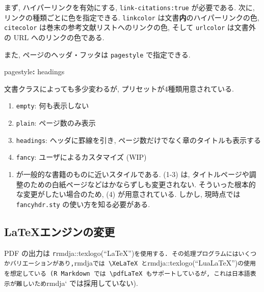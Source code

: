 \documentclass[
]{bxjsbook}
\newenvironment{Shaded}{\begin{snugshade}}{\end{snugshade}}
\newcommand{\AttributeTok}[1]{\textcolor[rgb]{0.77,0.63,0.00}{#1}}
\newcommand{\FunctionTok}[1]{\textcolor[rgb]{0.00,0.00,0.00}{#1}}
\newcommand{\KeywordTok}[1]{\textcolor[rgb]{0.13,0.29,0.53}{\textbf{#1}}}
\providecommand{\tightlist}{%
  \setlength{\itemsep}{0pt}\setlength{\parskip}{0pt}}
\theoremstyle{definition}
\theoremstyle{definition}
\theoremstyle{definition}
\theoremstyle{remark}
\begin{document}
まず, ハイパーリンクを有効にする, \texttt{link-citations:true}
が必要である. 次に, リンクの種類ごとに色を指定できる. \texttt{linkcolor}
は文書\textbf{内}のハイパーリンクの色, \texttt{citecolor}
は巻末の参考文献リストへのリンクの色, そして \texttt{urlcolor}
は文書外の URL へのリンクの色である.

また, ページのヘッダ・フッタは \texttt{pagestyle} で指定できる.

\begin{Shaded}
\begin{Highlighting}[]
\FunctionTok{pagestyle}\KeywordTok{:}\AttributeTok{ headings}
\end{Highlighting}
\end{Shaded}

文書クラスによっても多少変わるが, プリセットが4種類用意されている.

\begin{enumerate}
\def\labelenumi{\arabic{enumi}.}
\tightlist
\item
  \texttt{empty}: 何も表示しない
\item
  \texttt{plain}: ページ数のみ表示
\item
  \texttt{headings}: ヘッダに罫線を引き,
  ページ数だけでなく章のタイトルも表示する
\item
  \texttt{fancy}: ユーザによるカスタマイズ (WIP)
\end{enumerate}

\begin{enumerate}
\def\labelenumi{(\arabic{enumi})}
\setcounter{enumi}{2}
\tightlist
\item
  が一般的な書籍のものに近いスタイルである. (1-3) は,
  タイトルページや調整のための白紙ページなどはかならずしも変更されない.
  そういった根本的な変更がしたい場合のため, (4) が用意されている.
  しかし, 現時点では \texttt{fancyhdr.sty} の使い方を知る必要がある.
\end{enumerate}

\hypertarget{ux30a8ux30f3ux30b8ux30f3ux306eux5909ux66f4}{%
\subsection{\texorpdfstring{\LaTeX エンジンの変更}{エンジンの変更}}\label{ux30a8ux30f3ux30b8ux30f3ux306eux5909ux66f4}}

PDF の出力は
\texttt{r}rmdja::texlogo(``LaTeX'')\texttt{を使用する.\ その処理プログラムにはいくつかバリエーションがあり,}rmdja\texttt{では\ \textbackslash{}XeLaTeX\ と}rmdja::texlogo(``LuaLaTeX'')\texttt{の使用を想定している\ (R\ Markdown\ では\ \textbackslash{}pdfLaTeX\ もサポートしているが,\ これは日本語表示が難しいため}rmdja`
では採用していない).
\end{document}
